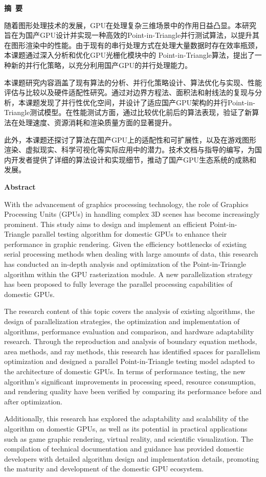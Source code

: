 \cleardoublepage{}
\begin{center}
    \bfseries {} 摘~要
\end{center}

随着图形处理技术的发展，GPU在处理复杂三维场景中的作用日益凸显。本研究旨在为国产GPU设计并实现一种高效的Point-in-Triangle并行测试算法，以提升其在图形渲染中的性能。由于现有的串行处理方式在处理大量数据时存在效率瓶颈，本课题通过深入分析和优化GPU光栅化模块中的 Point-in-Triangle算法，提出了一种新的并行化策略，以充分利用国产GPU的并行处理能力。

本课题研究内容涵盖了现有算法的分析、并行化策略设计、算法优化与实现、性能评估与比较以及硬件适配性研究。通过对边界方程法、面积法和射线法的复现与分析，本课题发现了并行性优化空间，并设计了适应国产GPU架构的并行Point-in-Triangle测试模型。在性能测试方面，通过比较优化前后的算法表现，验证了新算法在处理速度、资源消耗和渲染质量方面的显著提升。

此外，本课题还探讨了算法在国产GPU上的适配性和可扩展性，以及在游戏图形渲染、虚拟现实、科学可视化等实际应用中的潜力。技术文档与指导的编写，为国内开发者提供了详细的算法设计和实现细节，推动了国产GPU生态系统的成熟和发展。
\cleardoublepage{}
\begin{center}
    \bfseries {} Abstract
\end{center}
With the advancement of graphics processing technology, the role of Graphics Processing Units (GPUs) in handling complex 3D scenes has become increasingly prominent. This study aims to design and implement an efficient Point-in-Triangle parallel testing algorithm for domestic GPUs to enhance their performance in graphic rendering. Given the efficiency bottlenecks of existing serial processing methods when dealing with large amounts of data, this research has conducted an in-depth analysis and optimization of the Point-in-Triangle algorithm within the GPU rasterization module. A new parallelization strategy has been proposed to fully leverage the parallel processing capabilities of domestic GPUs.

The research content of this topic covers the analysis of existing algorithms, the design of parallelization strategies, the optimization and implementation of algorithms, performance evaluation and comparison, and hardware adaptability research. Through the reproduction and analysis of boundary equation methods, area methods, and ray methods, this research has identified spaces for parallelism optimization and designed a parallel Point-in-Triangle testing model adapted to the architecture of domestic GPUs. In terms of performance testing, the new algorithm's significant improvements in processing speed, resource consumption, and rendering quality have been verified by comparing its performance before and after optimization.

Additionally, this research has explored the adaptability and scalability of the algorithm on domestic GPUs, as well as its potential in practical applications such as game graphic rendering, virtual reality, and scientific visualization. The compilation of technical documentation and guidance has provided domestic developers with detailed algorithm design and implementation details, promoting the maturity and development of the domestic GPU ecosystem.